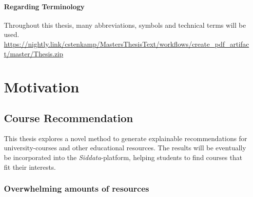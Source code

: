 \paragraph*{Regarding Terminology}

Throughout this thesis, many abbreviations, symbols and technical terms will be used.    \url{https://nightly.link/cstenkamp/MastersThesisText/workflows/create_pdf_artifact/master/Thesis.zip}

\section{Motivation}

\subsection{Course Recommendation}

This thesis explores a novel method to generate explainable recommendations for university-courses and other educational resources. The results will be eventually be incorporated into the \emph{Siddata}-platform, helping students to find courses that fit their interests.

\subsubsection*{Overwhelming amounts of resources}

